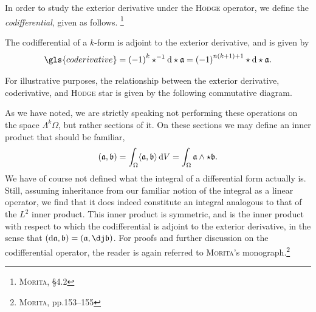 In order to study the exterior derivative under the \textsc{Hodge} operator, we define the \emph{codifferential}, given as follows.%
\footnote{%
\cite{morita2001geometry} \textsc{Morita}, \S4.2
}

\begin{definition}[Coderivative]
  The codifferential of a $k$-form is adjoint to the exterior derivative, and is given by
  \[
        \gls{coderivative} = {(-1)}^{k} \star^{-1} \dee \star \afrak = {(-1)}^{n(k+1) + 1} \star \dee \star \afrak.
  \]
\end{definition}

\noindent
For illustrative purposes, the relationship between the exterior derivative, coderivative, and \textsc{Hodge} star is given by the following commutative diagram.

\begin{figure}[H]
  \centering
\end{figure}

\noindent As we have noted, we are strictly speaking not performing these operations on the space $\Lambda^{k}\Omega$, but rather sections of it.
On these sections we may define an inner product that should be familiar,
\begin{equation}\label{eq:L2-norm}
        (\mathfrak{a}, \mathfrak{b}) = \int_{\Omega} \langle \mathfrak{a}, \mathfrak{b} \rangle \,\mathrm{d} V = \int_{\Omega} \mathfrak{a} \wedge \star \mathfrak{b}.
\end{equation}
We have of course not defined what the integral of a differential form actually is.
Still, assuming inheritance from our familiar notion of the integral as a linear operator, we find that it does indeed constitute an integral analogous to that of the $L^2$ inner product.
This inner product is symmetric, and is the inner product with respect to which the codifferential is adjoint to the exterior derivative, in the sense that $( \dee\afrak, \bfrak ) = ( \afrak, \codee\bfrak )$.
For proofs and further discussion on the codifferential operator, the reader is again referred to \textsc{Morita}'s monograph.\footnote{\cite{morita2001geometry} \textsc{Morita}, pp.153--155}

